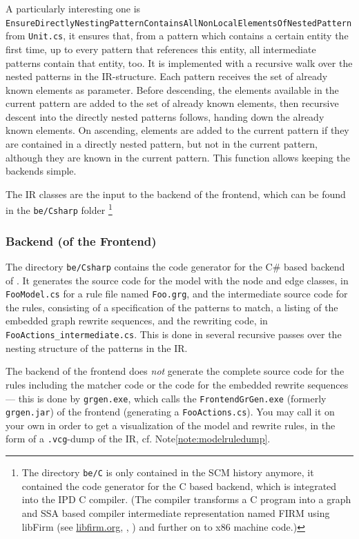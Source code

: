 A particularly interesting one is \texttt{Ensure\-Directly\-Nesting\-Pattern\-Contains\-All\-Non\-Local\-Elements\-Of\-Nested\-Pattern} from \texttt{Unit.cs}, it ensures that, from a pattern which contains a certain entity the first time, up to every pattern that references this entity, all intermediate patterns contain that entity, too.
It is implemented with a recursive walk over the nested patterns in the IR-structure. 
Each pattern receives the set of already known elements as parameter.
Before descending, the elements available in the current pattern are added to the set of already known elements,
then recursive descent into the directly nested patterns follows, handing down the already known elements.
On ascending, elements are added to the current pattern if they are contained in a directly nested pattern, but not in the current pattern, although they are known in the current pattern.
This function allows keeping the backends simple.

The IR classes are the input to the backend of the frontend, which can be found in the \texttt{be/Csharp} folder
\footnote{
The directory \texttt{be/C} is only contained in the SCM history anymore, it contained the code generator for the C based backend, which is integrated into the IPD C compiler.
(The compiler transforms a C program into a graph and SSA based compiler intermediate representation named FIRM using libFirm (see \url{libfirm.org}, \cite{TBL:99}, \cite{Lin:02}) and further on to x86 machine code.)
}

\subsubsection*{Backend (of the Frontend)}

The directory \texttt{be/Csharp} contains the code generator for the C\# based backend of \GrG. 
It generates the source code for the model with the node and edge classes, in \texttt{FooModel.cs} for a rule file named \texttt{Foo.grg},
and the intermediate source code for the rules, consisting of a specification of the patterns to match, a listing of the embedded graph rewrite sequences, and the rewriting code, in \texttt{Foo\-Actions\_intermediate.cs}.
This is done in several recursive passes over the nesting structure of the patterns in the IR. 

The backend of the frontend does \emph{not} generate the complete source code for the rules including the matcher code or the code for the embedded rewrite sequences --- this is done by \texttt{grgen.exe}, which calls the \texttt{FrontendGrGen.exe} (formerly \texttt{grgen.jar}) of the frontend (generating a \texttt{Foo\-Actions.cs}).
You may call it on your own in order to get a visualization of the model and rewrite rules, in the form of a \texttt{.vcg}-dump of the IR, cf. Note\ref{note:modelruledump}.


